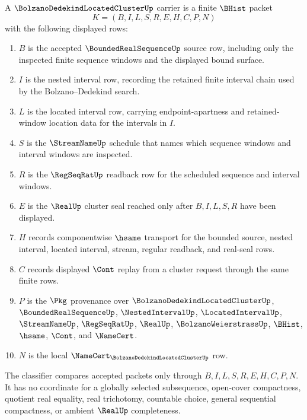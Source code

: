 \begin{definition}
\label{def:bolzano-dedekind-located-cluster-carrier}
A $\BolzanoDedekindLocatedClusterUp$ carrier is a finite $\BHist$ packet
$$
K=(B,I,L,S,R,E,H,C,P,N)
$$
with the following displayed rows:
\begin{enumerate}
\item $B$ is the accepted $\BoundedRealSequenceUp$ source row, including only the inspected finite sequence windows and the displayed bound surface.
\item $I$ is the nested interval row, recording the retained finite interval chain used by the Bolzano--Dedekind search.
\item $L$ is the located interval row, carrying endpoint-apartness and retained-window location data for the intervals in $I$.
\item $S$ is the $\StreamNameUp$ schedule that names which sequence windows and interval windows are inspected.
\item $R$ is the $\RegSeqRatUp$ readback row for the scheduled sequence and interval windows.
\item $E$ is the $\RealUp$ cluster seal reached only after $B,I,L,S,R$ have been displayed.
\item $H$ records componentwise $\hsame$ transport for the bounded source, nested interval, located interval, stream, regular readback, and real-seal rows.
\item $C$ records displayed $\Cont$ replay from a cluster request through the same finite rows.
\item $P$ is the $\Pkg$ provenance over $\BolzanoDedekindLocatedClusterUp$, $\BoundedRealSequenceUp$, $\NestedIntervalUp$, $\LocatedIntervalUp$, $\StreamNameUp$, $\RegSeqRatUp$, $\RealUp$, $\BolzanoWeierstrassUp$, $\BHist$, $\hsame$, $\Cont$, and $\NameCert$.
\item $N$ is the local $\NameCert_{\BolzanoDedekindLocatedClusterUp}$ row.
\end{enumerate}
The classifier compares accepted packets only through $B,I,L,S,R,E,H,C,P,N$. It has no coordinate for a globally selected subsequence, open-cover compactness, quotient real equality, real trichotomy, countable choice, general sequential compactness, or ambient $\RealUp$ completeness.
\end{definition}

